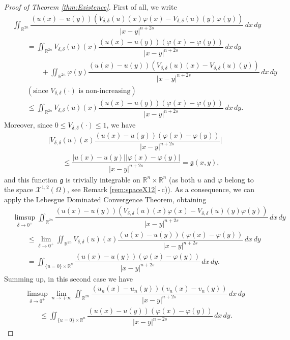 \documentclass[11pt,a4paper]{amsart}
\def \R {\mathbb{R}}
\theoremstyle{definition}
\theoremstyle{plain}
\numberwithin{equation}{section}
\begin{document}
{\begin{proof}[Proof of Theorem \ref{thm:Existence}]
 First of all, we write
 \begin{align*}
  & \iint_{\R^{2n}}\dfrac{(u(x)-u(y))(V_{\delta,\delta}(u)(x)\varphi(x)-
  V_{\delta,\delta}(u)(y)\varphi(y))}{|x-y|^{n+2s}}\,dx\,dy \\
  & \qquad
  = \iint_{\R^{2n}}V_{\delta,\delta}(u)(x)\dfrac{(u(x)-u(y))(\varphi(x)-
 \varphi(y))}{|x-y|^{n+2s}}\,dx\,dy \\
 & \qquad\qquad
 +
 \iint_{\R^{2n}}\varphi(y)\dfrac{(u(x)-u(y))(V_{\delta,\delta}(u)(x)-
  V_{\delta,\delta}(u)(y))}{|x-y|^{n+2s}}\,dx\,dy \\
  & \qquad (\text{since $V_{\delta,\delta}(\cdot)$ is non-increasing}) \\
  & \qquad\leq \iint_{\R^{2n}}V_{\delta,\delta}(u)(x)\dfrac{(u(x)-u(y))(\varphi(x)-
 \varphi(y))}{|x-y|^{n+2s}}\,dx\,dy.
 \end{align*}
 Moreover, since $0\leq V_{\delta,\delta}(\cdot)\leq 1$, we have
 \begin{align*}
  & \Big|V_{\delta,\delta}(u)(x)\dfrac{(u(x)-u(y))(\varphi(x)-
 \varphi(y))}{|x-y|^{n+2s}}\Big| \\
 & \qquad
  \leq \dfrac{|u(x)-u(y)||\varphi(x)-
 \varphi(y)|}{|x-y|^{n+2s}} = \mathfrak{g}(x,y),
 \end{align*}
 and this function $\mathfrak{g}$ is trivially integrable on $\R^n\times\R^n$ (as both $u$ and $\varphi$
 belong to the space $\mathcal{X}^{1,2}(\Omega)$, see Remark \ref{rem:spaceX12}\,-\,c)).
 As a consequence, we can apply the Lebesgue Dominated Convergence Theorem, obtaining
 \begin{align*}
  & \limsup_{\delta\to 0^+}
  \iint_{\R^{2n}}\dfrac{(u(x)-u(y))(V_{\delta,\delta}(u)(x)\varphi(x)-
  V_{\delta,\delta}(u)(y)\varphi(y))}{|x-y|^{n+2s}}\,dx\,dy \\
  & \qquad \leq \lim_{\delta\to 0^+}\iint_{\R^{2n}}V_{\delta,\delta}(u)(x)\dfrac{(u(x)-u(y))(\varphi(x)-
 \varphi(y))}{|x-y|^{n+2s}}\,dx\,dy \\
 & \qquad = 
 \iint_{\{u = 0\}\times\R^n}\dfrac{(u(x)-u(y))(\varphi(x)-
 \varphi(y))}{|x-y|^{n+2s}}\,dx\,dy.
 \end{align*}
 Summing up, in this second case we have
 \begin{equation*}
\begin{split}
& \limsup_{\delta\to 0^+}
\lim_{n\to+\infty}
 \iint_{\R^{2n}}\dfrac{(u_n(x)-u_n(y))(v_n(x)-v_n(y))}{|x-y|^{n+2s}}\,dx\,dy \\
 & \qquad
 \leq \iint_{\{u = 0\}\times\R^n}\dfrac{(u(x)-u(y))(\varphi(x)-
 \varphi(y))}{|x-y|^{n+2s}}\,dx\,dy.

\end{split}
\end{equation*}
\end{proof}}
\end{document}
